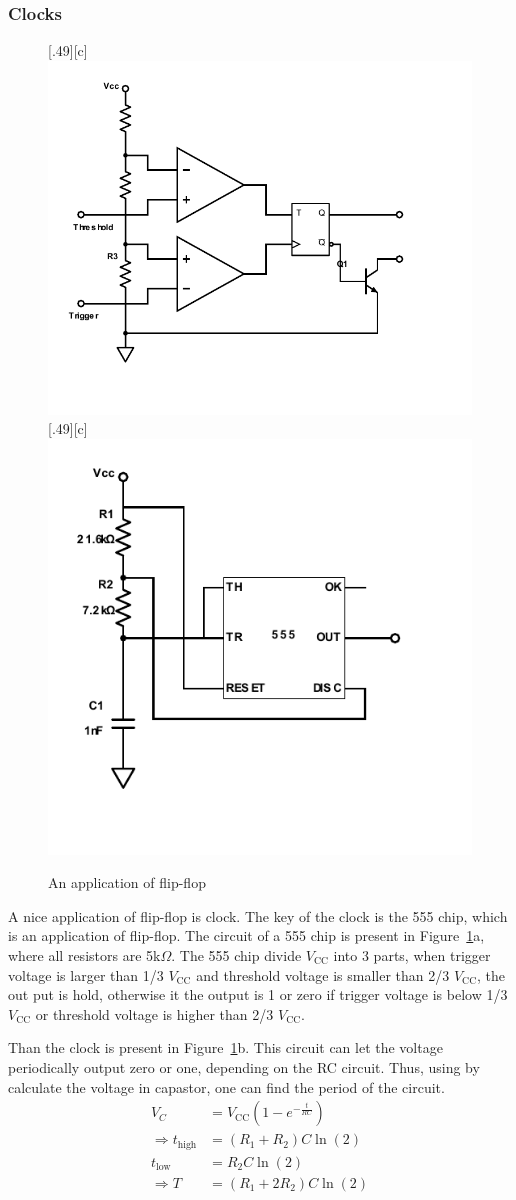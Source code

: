 \documentclass[aps,prl,reprint]{revtex4-1}
\newcommand{\vcc}{V_\text{CC}}
\begin{document}
        \subsubsection{Clocks}
            \begin{figure}[h]
                \centering
                [.49\linewidth][c]{%
                    \includegraphics[width=.55\linewidth]{image/555-Chip.pdf}}
                [.49\linewidth][c]{%
                    \includegraphics[width=.44\linewidth]{image/Clocks.pdf}}
                \caption{An application of flip-flop}
                \label{fig:clocks}
            \end{figure}
            A nice application of flip-flop is clock. The key of the clock is the 555 chip, which is an application of flip-flop. The circuit of a 555 chip is present in Figure~\ref{fig:clocks}a, where all resistors are 5k$\Omega$. The 555 chip divide $\vcc$ into 3 parts, when trigger voltage is larger than 1/3 $\vcc$ and threshold voltage is smaller than 2/3 $\vcc$, the out put is hold, otherwise it the output is 1 or zero if trigger voltage is below 1/3 $\vcc$ or threshold voltage is higher than 2/3 $\vcc$.

            Than the clock is present in Figure~\ref{fig:clocks}b. This circuit can let the voltage periodically output zero or one, depending on the RC circuit. Thus, using by calculate the voltage in capastor, one can find the period of the circuit.
            \begin{align*}
                V_C &= \vcc (1 - e^{-\frac{t}{RC}})\\
                \Rightarrow t_\text{high} &= (R_1 + R_2)C\ln(2)\\
                t_\text{low} &= R_2 C \ln(2)\\
                \Rightarrow T &= (R_1 + 2R_2) C \ln(2)
            \end{align*}
\end{document}
